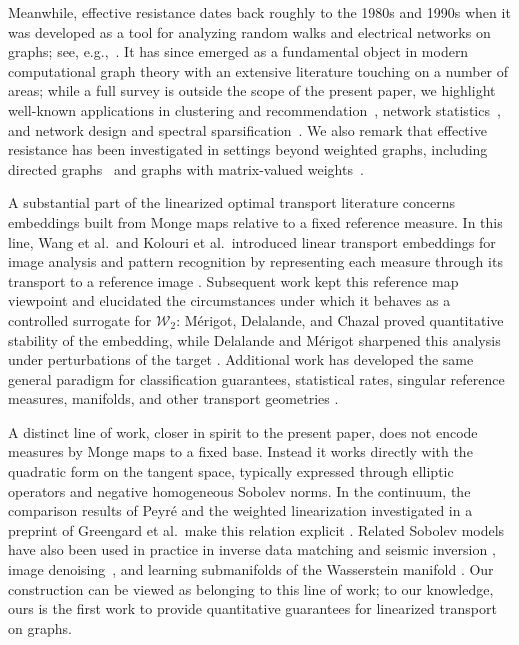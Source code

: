 \documentclass[11pt,a4paper]{article}
\newcommand{\Wass}{\mathcal{W}}
\begin{document}
Meanwhile, effective resistance dates back roughly to the 1980s and 1990s when it was developed as a tool for analyzing random walks and electrical networks on graphs; see, e.g.,~\cite{doylesnell1984random,chandra1996electrical,tetali1991random}. It has since emerged as a fundamental object in modern computational graph theory with an extensive literature touching on a number of areas; while a full survey is outside the scope of the present paper, we highlight well-known applications in clustering and recommendation~\cite{fouss2007random}, network statistics~\cite{newman2005measure,brandes2005centrality}, and network design and spectral sparsification~\cite{ghosh2008minimizing,spielman2011graph}. We also remark that effective resistance has been investigated in settings beyond weighted graphs, including directed graphs~\cite{young2016newi,young2016newii,sugiyama2023kron} and graphs with matrix-valued weights~\cite{atik2019resistance,cloninger2024random}.

A substantial part of the linearized optimal transport literature concerns embeddings built from Monge maps relative to a fixed reference measure. In this line, Wang et al.\ and Kolouri et al.\ introduced linear transport embeddings for image analysis and pattern recognition by representing each measure through its transport to a reference image \cite{wang2013linear,kolouri2016continuous}. Subsequent work kept this reference map viewpoint and elucidated the circumstances under which it behaves as a controlled surrogate for $\Wass_2$: M\'erigot, Delalande, and Chazal proved quantitative stability of the embedding, while Delalande and M\'erigot sharpened this analysis under perturbations of the target \cite{merigot2020quantitative,delalanda2023quantitative}. Additional work has developed the same general paradigm for classification guarantees, statistical rates, singular reference measures, manifolds, and other transport geometries \cite{park2018cumulative, moosmuller2023linear,aldroubi2021partitioning, cloninger2025linearized, nenna2023transport,sarrazin2024linearized,cai2022linearized,bai2023linear}. 

A distinct line of work, closer in spirit to the present paper, does not encode measures by Monge maps to a fixed base. Instead it works directly with the quadratic form on the tangent space, typically expressed through elliptic operators and negative homogeneous Sobolev norms. In the continuum, the comparison results of Peyr\'e and the weighted linearization investigated in a preprint of Greengard et al.\ make this relation explicit \cite{peyre2018comparison,greengard2022linearization}. Related Sobolev models have also been used in practice in inverse data matching and seismic inversion \cite{engquist2020quadratic,engquist2022optimal}, image denoising~\cite{zhu2024implicit}, and learning submanifolds of the Wasserstein manifold \cite{hamm2025manifold}. Our construction can be viewed as belonging to this line of work; to our knowledge, ours is the first work to provide quantitative guarantees for linearized transport on graphs. 
\end{document}
